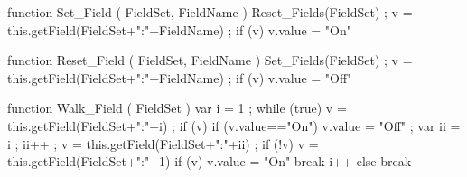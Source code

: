 function Set_Field ( FieldSet, FieldName )
  { Reset_Fields(FieldSet) ;
    v = this.getField(FieldSet+":"+FieldName) ;
    if (v) { v.value = "On" } }

function Reset_Field ( FieldSet, FieldName )
  { Set_Fields(FieldSet) ;
    v = this.getField(FieldSet+":"+FieldName) ;
    if (v) { v.value = "Off" } }

function Walk_Field ( FieldSet )
  { var i = 1 ;
    while (true)
      { v = this.getField(FieldSet+":"+i) ;
        if (v)
          { if (v.value=="On")
              { v.value = "Off" ;
                var ii = i ; ii++ ;
                v = this.getField(FieldSet+":"+ii) ;
                if (!v)
                  { v = this.getField(FieldSet+":"+1) }
                if (v)
                  { v.value = "On" }
                break }
            i++ }
        else
          { break } } }

\stopJSpreamble

\endinput
